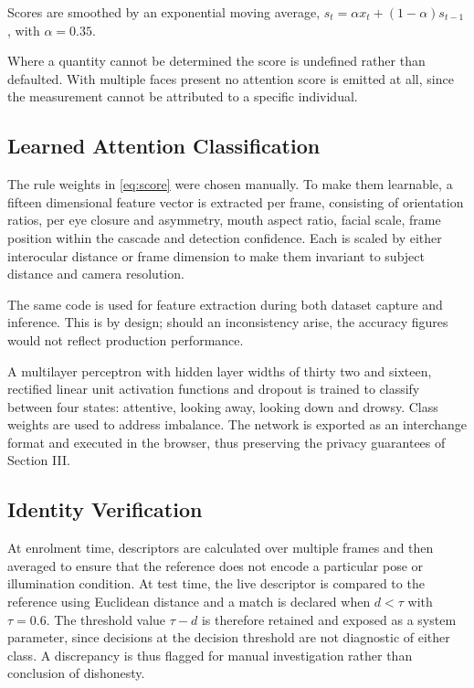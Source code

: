 \documentclass[conference]{IEEEtran}
\begin{document}
Scores are smoothed by an exponential moving average,
$s_{t} = \alpha x_{t} + (1-\alpha)s_{t-1}$, with $\alpha = 0.35$.

Where a quantity cannot be determined the score is undefined rather than
defaulted. With multiple faces present no attention score is emitted at
all, since the measurement cannot be attributed to a specific individual.

\subsection{Learned Attention Classification}

The rule weights in \eqref{eq:score} were chosen manually. To make them learnable,
a fifteen dimensional feature vector is extracted per frame, consisting of
orientation ratios, per eye closure and asymmetry, mouth aspect ratio,
facial scale, frame position within the cascade and detection confidence.
Each is scaled by either interocular distance or frame dimension to make
them invariant to subject distance and camera resolution.

The same code is used for feature extraction during both dataset capture and
inference. This is by design; should an inconsistency arise, the accuracy figures
would not reflect production performance.

A multilayer perceptron with hidden layer widths of thirty two and
sixteen, rectified linear unit activation functions and dropout is trained
to classify between four states: attentive, looking away, looking down
and drowsy. Class weights are used to address imbalance. The network
is exported as an interchange format and executed in the browser,
thus preserving the privacy guarantees of Section III.

\subsection{Identity Verification}

At enrolment time, descriptors are calculated over multiple frames and then averaged
to ensure that the reference does not encode a particular pose or
illumination condition. At test time, the live descriptor is compared to
the reference using Euclidean distance and a match is declared
when $d < \tau$ with $\tau = 0.6$. The threshold value $\tau - d$ is therefore retained and exposed
as a system parameter, since decisions at the decision threshold are
not diagnostic of either class. A discrepancy is thus flagged for
manual investigation rather than conclusion of dishonesty.
\end{document}
